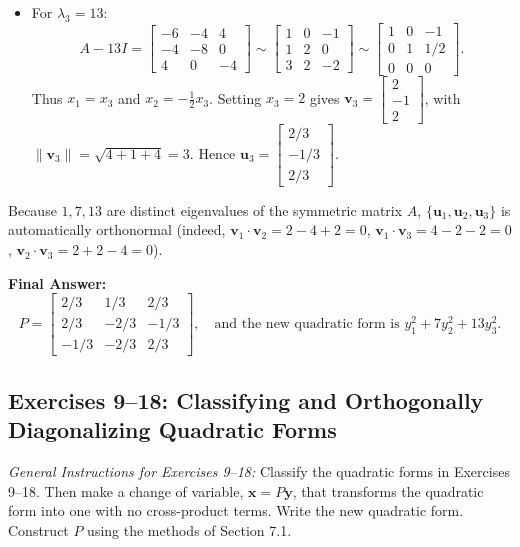 \documentclass[11pt, letterpaper]{article}
\theoremstyle{definition}
\theoremstyle{remark}
\begin{document}
\begin{itemize}
    \item For $\lambda_3 = 13$:
    \[
    A - 13I = \begin{bmatrix} -6 & -4 & 4 \\ -4 & -8 & 0 \\ 4 & 0 & -4 \end{bmatrix} \sim \begin{bmatrix} 1 & 0 & -1 \\ 1 & 2 & 0 \\ 3 & 2 & -2 \end{bmatrix} \sim \begin{bmatrix} 1 & 0 & -1 \\ 0 & 1 & 1/2 \\ 0 & 0 & 0 \end{bmatrix}.
    \]
    Thus $x_1 = x_3$ and $x_2 = -\frac{1}{2}x_3$. Setting $x_3 = 2$ gives $\mathbf{v}_3 = \begin{bmatrix} 2 \\ -1 \\ 2 \end{bmatrix}$, with $\|\mathbf{v}_3\| = \sqrt{4 + 1 + 4} = 3$. Hence $\mathbf{u}_3 = \begin{bmatrix} 2/3 \\ -1/3 \\ 2/3 \end{bmatrix}$.
\end{itemize}
Because $1, 7, 13$ are distinct eigenvalues of the symmetric matrix $A$, $\{\mathbf{u}_1, \mathbf{u}_2, \mathbf{u}_3\}$ is automatically orthonormal (indeed, $\mathbf{v}_1 \cdot \mathbf{v}_2 = 2 - 4 + 2 = 0$, $\mathbf{v}_1 \cdot \mathbf{v}_3 = 4 - 2 - 2 = 0$, $\mathbf{v}_2 \cdot \mathbf{v}_3 = 2 + 2 - 4 = 0$).

\textbf{Final Answer:}
\[
P = \begin{bmatrix} 2/3 & 1/3 & 2/3 \\ 2/3 & -2/3 & -1/3 \\ -1/3 & -2/3 & 2/3 \end{bmatrix}, \quad \text{and the new quadratic form is } y_1^2 + 7y_2^2 + 13y_3^2.
\]

\subsection{Exercises 9--18: Classifying and Orthogonally Diagonalizing Quadratic Forms}

\emph{General Instructions for Exercises 9--18:} Classify the quadratic forms in Exercises 9--18. Then make a change of variable, $\mathbf{x} = P\mathbf{y}$, that transforms the quadratic form into one with no cross-product terms. Write the new quadratic form. Construct $P$ using the methods of Section 7.1.
\end{document}
